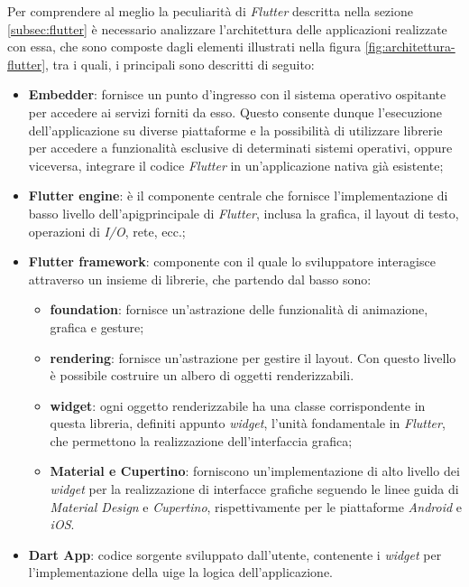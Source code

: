Per comprendere al meglio la peculiarità di \emph{Flutter} descritta nella sezione \ref{subsec:flutter} è necessario analizzare l'architettura\cite{site:flutter-architecture} delle applicazioni realizzate con essa, che sono composte dagli elementi illustrati nella figura \ref{fig:architettura-flutter}, tra i quali, i principali sono descritti di seguito:
\begin{itemize}
    \item \textbf{Embedder}: fornisce un punto d'ingresso con il sistema operativo ospitante per accedere ai servizi forniti da esso. Questo consente dunque l'esecuzione dell'applicazione su diverse piattaforme e la possibilità di utilizzare librerie per accedere a funzionalità esclusive di determinati sistemi operativi, oppure viceversa, integrare il codice \emph{Flutter} in un'applicazione nativa già esistente;
    \item \textbf{Flutter engine}: è il componente centrale che fornisce l'implementazione di basso livello dell'\gls{apig}\glsoccur principale di \emph{Flutter}, inclusa la grafica, il layout di testo, operazioni di \emph{I/O}, rete, ecc.;
    \item \textbf{Flutter framework}: componente con il quale lo sviluppatore interagisce attraverso un insieme di librerie, che partendo dal basso sono:
    \begin{itemize}
        \item \textbf{foundation}: fornisce un'astrazione delle funzionalità di animazione, grafica e \gls{gesture}\glsoccur;
        \item \textbf{rendering}: fornisce un'astrazione per gestire il layout. Con questo livello è possibile costruire un albero di oggetti renderizzabili.
        \item \textbf{widget}: ogni oggetto renderizzabile ha una classe corrispondente in questa libreria, definiti appunto \emph{widget}, l'unità fondamentale in \emph{Flutter}, che permettono la realizzazione dell'interfaccia grafica;
        \item \textbf{Material e Cupertino}: forniscono un'implementazione di alto livello dei \emph{widget} per la realizzazione di interfacce grafiche seguendo le linee guida di \emph{Material Design} e \emph{Cupertino}, rispettivamente per le piattaforme \emph{Android} e \emph{iOS}.
    \end{itemize}
    \item \textbf{Dart App}: codice sorgente sviluppato dall'utente, contenente i \emph{widget} per l'implementazione della \gls{uig}\glsoccur e la logica dell'applicazione.
\end{itemize}

